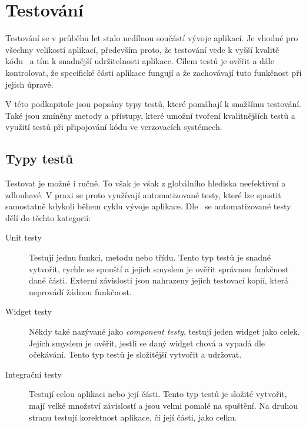\section{Testování}

Testování se v průběhu let stalo nedílnou součástí vývoje aplikací.
Je vhodné pro všechny velikostí aplikací,
především proto,
že testování vede k vyšší kvalitě kódu~\cite{testing_quality}
a tím k snadnější udržitelnosti aplikace.
Cílem testů je ověřit a dále kontrolovat,
že specifické části aplikace fungují
a že zachovávají tuto funkčnost při jejich úpravě.
\cite{martin_clean_architecture}

V této podkapitole jsou popsány typy testů,
které pomáhají k snažšímu testování.
Také jsou zmíněny metody a přístupy,
které umožní tvoření kvalitnějších testů
a využití testů při připojování kódu ve verzovacích systémech.

\subsection{Typy testů}

Testovat je možné i ručně.
To však je však z globálního hlediska neefektivní a zdlouhavé.
V praxi se proto využívají automatizované testy,
které lze spustit samostatně kdykoli během cyklu vývoje aplikace.
Dle~\cite{testing_flutter} se automatizované testy dělí do těchto kategorií:

\begin{description}
    \item[Unit testy] Testují jednu funkci, metodu nebo třídu.
    Tento typ testů je snadné vytvořit,
    rychle se spouští
    a jejich smyslem je ověřit správnou funkčnost dané části.
    Externí závislosti jsou nahrazeny jejich testovací kopií,
    která neprovádí žádnou funkčnost.
    \item[Widget testy] Někdy také nazývané jako \emph{component testy},
    testují jeden widget jako celek.
    Jejich smyslem je ověřit,
    jestli se daný widget chová a vypadá dle očekávání.
    Tento typ testů je složitější vytvořit a udržovat.
    \item[Integrační testy] Testují celou aplikaci nebo její části.
    Tento typ testů je složité vytvořit,
    mají velké množství závislostí a jsou velmi pomalé na spuštění.
    Na druhou stranu testují korektnost aplikace,
    či její části,
    jako celku.
\end{description}

